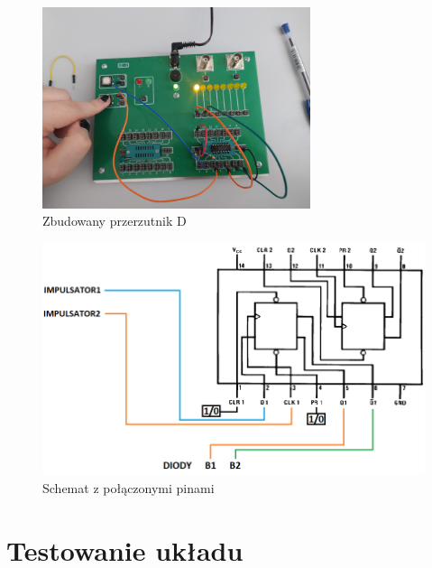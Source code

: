 \begin{itemize}
\begin{figure}[H]
            \centering
            \includegraphics[width=0.7\textwidth]{img/5_2/1653500525143_scaled.png}
            \caption{Zbudowany przerzutnik D}
            \label{D_jednozboczowy:zbudowany}
        \end{figure}
        
        \begin{figure}[H]
            \centering
            \includegraphics[width=\textwidth]{img/schemes_w_pins/5_2_w_pins.png}
            \caption{Schemat z połączonymi pinami}
            \label{D_jednozboczowy:schemat_z_pinami}
        \end{figure}
\end{itemize}

\pagebreak

\section{Testowanie układu}

